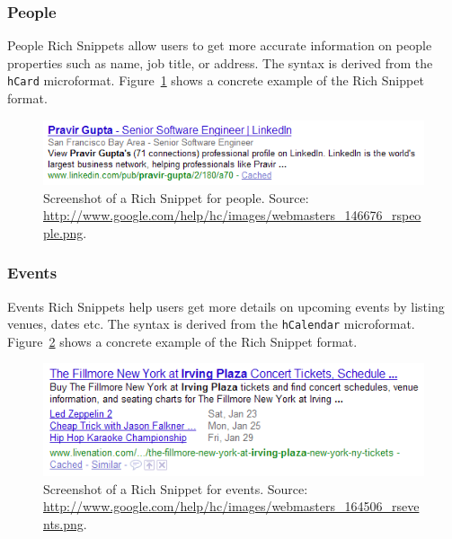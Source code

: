 \documentclass[12pt]{article}
\begin{document}
\subsubsection{People}
People Rich Snippets allow users to get more accurate information on people properties such as name, job title, or address. The syntax is derived from the \texttt{hCard} microformat. Figure~\ref{fig:rich-snippets-people} shows a concrete example of the Rich Snippet format.
\begin{figure}[htbp!]
\begin{center}
  \includegraphics[width=0.75\linewidth]{./resources/rich-snippets-people.png}
  \caption[Screenshot of a Rich Snippet for people.]{Screenshot of a Rich Snippet for people. Source: \url{http://www.google.com/help/hc/images/webmasters_146676_rspeople.png}.}
  \label{fig:rich-snippets-people}
  \end{center}  
\end{figure}

\subsubsection{Events}
Events Rich Snippets help users get more details on upcoming events by listing venues, dates etc. The syntax is derived from the \texttt{hCalendar} microformat. Figure~\ref{fig:rich-snippets-events} shows a concrete example of the Rich Snippet format.
\begin{figure}[htbp!]
\begin{center}
  \includegraphics[width=0.75\linewidth]{./resources/rich-snippets-events.png}
  \caption[Screenshot of a Rich Snippet for events.]{Screenshot of a Rich Snippet for events. Source: \url{http://www.google.com/help/hc/images/webmasters_164506_rsevents.png}.}
  \label{fig:rich-snippets-events}
  \end{center}  
\end{figure}
\end{document}
